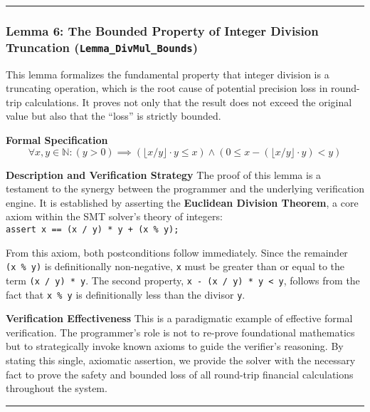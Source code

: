 \documentclass[
  english,
  onecolumn]{article}
\begin{document}
\begin{center}\rule{0.5\linewidth}{0.5pt}\end{center}

\subsubsection{\texorpdfstring{\textbf{Lemma 6: The Bounded Property of
Integer Division Truncation
(\texttt{Lemma\_DivMul\_Bounds})}}{Lemma 6: The Bounded Property of Integer Division Truncation (Lemma\_DivMul\_Bounds)}}\label{lemma-6-the-bounded-property-of-integer-division-truncation-lemma_divmul_bounds}

This lemma formalizes the fundamental property that integer division is
a truncating operation, which is the root cause of potential precision
loss in round-trip calculations. It proves not only that the result does
not exceed the original value but also that the ``loss'' is strictly
bounded.

\textbf{Formal Specification} \[
\forall x, y \in \mathbb{N} : (y > 0) \implies (\lfloor x/y \rfloor \cdot y \le x) \land (0 \le x - (\lfloor x/y \rfloor \cdot y) < y)
\]

\textbf{Description and Verification Strategy} The proof of this lemma
is a testament to the synergy between the programmer and the underlying
verification engine. It is established by asserting the
\textbf{Euclidean Division Theorem}, a core axiom within the SMT
solver's theory of integers:
\texttt{assert\ x\ ==\ (x\ /\ y)\ *\ y\ +\ (x\ \%\ y);}

From this axiom, both postconditions follow immediately. Since the
remainder \texttt{(x\ \%\ y)} is definitionally non-negative, \texttt{x}
must be greater than or equal to the term \texttt{(x\ /\ y)\ *\ y}. The
second property, \texttt{x\ -\ (x\ /\ y)\ *\ y\ \textless{}\ y}, follows
from the fact that \texttt{x\ \%\ y} is definitionally less than the
divisor \texttt{y}.

\textbf{Verification Effectiveness} This is a paradigmatic example of
effective formal verification. The programmer's role is not to re-prove
foundational mathematics but to strategically invoke known axioms to
guide the verifier's reasoning. By stating this single, axiomatic
assertion, we provide the solver with the necessary fact to prove the
safety and bounded loss of all round-trip financial calculations
throughout the system.

\begin{center}\rule{0.5\linewidth}{0.5pt}\end{center}
\end{document}
